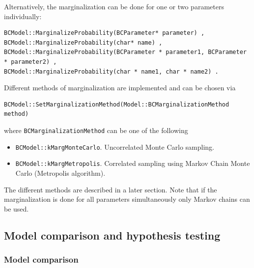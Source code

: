 \documentclass[11pt, a4paper]{article}
\begin{document}
\noindent 
Alternatively, the marginalization can be done for one or two
parameters individually: 
%
\begin{verbatim}
BCModel::MarginalizeProbability(BCParameter* parameter) ,
BCModel::MarginalizeProbability(char* name) , 
BCModel::MarginalizeProbability(BCParameter * parameter1, BCParameter * parameter2) ,
BCModel::MarginalizeProbability(char * name1, char * name2) .
\end{verbatim} 

\noindent 
Different methods of marginalization are implemented and can be chosen
via
%
\begin{verbatim}
BCModel::SetMarginalizationMethod(Model::BCMarginalizationMethod method)
\end{verbatim} 

\noindent
where \verb|BCMarginalizationMethod| can be one of the following 
% 
\begin{itemize}
\item \verb|BCModel::kMargMonteCarlo|. Uncorrelated Monte Carlo sampling.
\item \verb|BCModel::kMargMetropolis|. Correlated sampling using
  Markov Chain Monte Carlo (Metropolis algorithm).
\end{itemize} 

\noindent 
The different methods are described in a later section. Note that if
the marginalization is done for all parameters simultaneously only
Markov chains can be used. \\


\subsection{Model comparison and hypothesis testing} 


\subsubsection{Model comparison}
\end{document}
